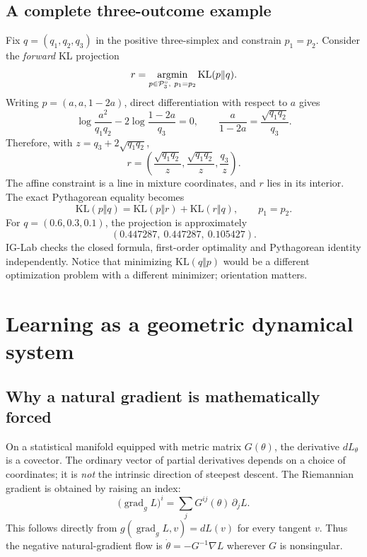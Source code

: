 \documentclass[11pt]{article}
\theoremstyle{definition}\newtheorem{definition}[theorem]{Definition}\newtheorem{exercise}{Problem}[section]
\newcommand{\KL}{\mathrm{KL}}
\begin{document}
\subsection{A complete three-outcome example}

Fix $q=(q_1,q_2,q_3)$ in the positive three-simplex and constrain $p_1=p_2$. Consider the \emph{forward} KL projection
\[
 r=\operatorname*{argmin}_{p\in\Pp_3^\circ,\ p_1=p_2}\KL(p\Vert q).
\]
Writing $p=(a,a,1-2a)$, direct differentiation with respect to $a$ gives
\[
\log\frac{a^2}{q_1q_2}-2\log\frac{1-2a}{q_3}=0,
\qquad \frac{a}{1-2a}=\frac{\sqrt{q_1q_2}}{q_3}.
\]
Therefore, with $z=q_3+2\sqrt{q_1q_2}$,
\begin{equation}\label{eq:closedprojection}
 \boxed{\quad r=\left(\frac{\sqrt{q_1q_2}}z,\frac{\sqrt{q_1q_2}}z,\frac{q_3}z\right).\quad}
\end{equation}
The affine constraint is a line in mixture coordinates, and $r$ lies in its interior. The exact Pythagorean equality becomes
\[
 \KL(p\Vert q)=\KL(p\Vert r)+\KL(r\Vert q),\qquad p_1=p_2.
\]
For $q=(0.6,0.3,0.1)$, the projection is approximately
\[ (0.447287,\ 0.447287,\ 0.105427). \]
IG-Lab checks the closed formula, first-order optimality and Pythagorean identity independently. Notice that minimizing $\KL(q\Vert p)$ would be a different optimization problem with a different minimizer; orientation matters.

\section{Learning as a geometric dynamical system}\label{sec:learning}

\subsection{Why a natural gradient is mathematically forced}

On a statistical manifold equipped with metric matrix $G(\theta)$, the derivative $dL_\theta$ is a covector. The ordinary vector of partial derivatives depends on a choice of coordinates; it is \emph{not} the intrinsic direction of steepest descent. The Riemannian gradient is obtained by raising an index:
\begin{equation}\label{eq:grad}
 \bigl(\operatorname{grad}_g L\bigr)^i
 =\sum_jG^{ij}(\theta)\,\partial_jL.
\end{equation}
This follows directly from $g(\operatorname{grad}_gL,v)=dL(v)$ for every tangent $v$. Thus the negative natural-gradient flow is $\dot\theta=-G^{-1}\nabla L$ wherever $G$ is nonsingular.
\end{document}
